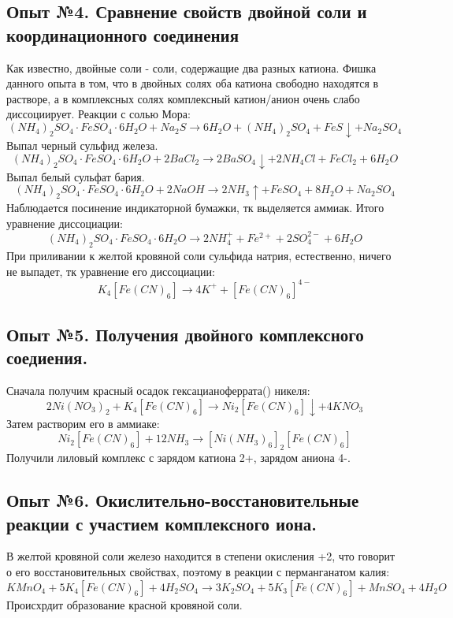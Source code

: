 \documentclass[a4paper,12pt]{article}
\newcommand{\RomanNumeralCaps}[1]
    {\MakeUppercase{\romannumeral #1}}
\begin{document}
\subsection{Опыт №4. Сравнение свойств двойной соли и координационного соединения }
Как известно, двойные соли - соли, содержащие два разных катиона. Фишка данного опыта в том, что в двойных солях оба катиона свободно находятся в растворе, а в комплексных солях комплексный катион/анион очень слабо диссоциирует.
Реакции с солью Мора:
\begin{equation}
    (NH_4)_2SO_4\cdot FeSO_4 \cdot 6H_2O + Na_2S \xrightarrow[]{} 6H_2O + (NH_4)_2SO_4 + FeS\downarrow +Na_2SO_4
\end{equation}
Выпал черный сульфид железа.
\begin{equation}
    (NH_4)_2SO_4\cdot FeSO_4 \cdot 6H_2O + 2BaCl_2 \xrightarrow[]{} 2BaSO_4\downarrow + 2NH_4Cl + FeCl_2 + 6H_2O
\end{equation}
Выпал белый сульфат бария.
\begin{equation}
    (NH_4)_2SO_4\cdot FeSO_4 \cdot 6H_2O + 2NaOH \xrightarrow[]{} 2NH_3\uparrow + FeSO_4 + 8H_2O + Na_2SO_4
\end{equation}
Наблюдается посинение индикаторной бумажки, тк выделяется аммиак. Итого уравнение диссоциации:
\begin{equation}
(NH_4)_2SO_4\cdot FeSO_4 \cdot 6H_2O \xrightarrow[]{} 2NH_4^+ + Fe^{2+} + 2SO_4^{2-} + 6H_2O
\end{equation}
При приливании к желтой кровяной соли сульфида натрия, естественно, ничего не выпадет, тк уравнение его диссоциации:
\begin{equation}
    K_4[Fe(CN)_6] \xrightarrow[]{} 4K^+ + [Fe(CN)_6]^{4-}
\end{equation}
\subsection{Опыт №5. Получения двойного комплексного соедиения.}
Сначала получим красный осадок гексацианоферрата(\RomanNumeralCaps{2}) никеля:
\begin{equation}
    2Ni(NO_3)_2 + K_4[Fe(CN)_6] \xrightarrow[]{} Ni_2[Fe(CN)_6]\downarrow + 4KNO_3
\end{equation}
Затем растворим его в аммиаке:
\begin{equation}
    Ni_2[Fe(CN)_6] + 12NH_3 \xrightarrow[]{} [Ni(NH_3)_6]_2[Fe(CN)_6]
\end{equation}
Получили лиловый комплекс с зарядом катиона 2+, зарядом аниона 4-.
\subsection{Опыт №6. Окислительно-восстановительные реакции с участием комплексного иона.}
В желтой кровяной соли железо находится в степени окисления +2, что говорит о его восстановительных свойствах, поэтому в реакции с перманганатом калия:
\begin{equation}
    KMnO_4 + 5K_4[Fe(CN)_6] + 4H_2SO_4 \xrightarrow[]{} 3K_2SO_4 + 5K_3[Fe(CN)_6] + MnSO_4 + 4H_2O
\end{equation}
Происхрдит образование красной кровяной соли.
\end{document}
